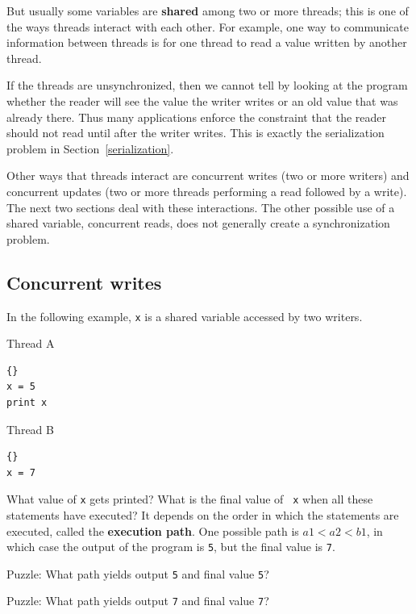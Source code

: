 \documentclass{book}
\begin{document}
But usually some variables are {\bf shared} among two or more
threads; this is one of the ways threads interact with each other.
For example, one way to communicate information between threads is
for one thread to read a value written by another thread.

If the threads are unsynchronized, then we cannot tell by looking at
the program whether the reader will see the value the writer writes
or an old value that was already there.
Thus many applications enforce the constraint that the reader
should not read until after the writer writes.  This is exactly
the serialization problem in Section~\ref{serialization}.

Other ways that threads interact are
concurrent writes (two or more writers) and concurrent updates
(two or more threads performing a read followed by a write).
The next two sections deal with these interactions.  The other
possible use of a shared variable, concurrent
reads, does not generally create a synchronization problem.


\subsection {Concurrent writes}

In the following example, {\tt x} is a shared variable accessed
by two writers.

\begin{minipage}[t]{2in}
Thread A                
\begin{lstlisting}[labelstyle=a, indent=25pt]{}
x = 5
print x
\end{lstlisting}
\end{minipage}
\hfill
\begin{minipage}[t]{2in}
Thread B
\begin{lstlisting}[labelstyle=b, indent=25pt]{}
x = 7
\end{lstlisting}
\end{minipage}

What value of {\tt x} gets printed?  What is the final value of {\tt
x} when all these statements have executed?  It depends on the order
in which the statements are executed, called the {\bf execution path}.
One possible path is $a1 < a2 < b1$, in which case the output of the
program is {\tt 5}, but the final value is {\tt 7}.

Puzzle: What path yields output {\tt 5} and final
value {\tt 5}?

Puzzle: What path yields output {\tt 7} and final
value {\tt 7}?
\end{document}
